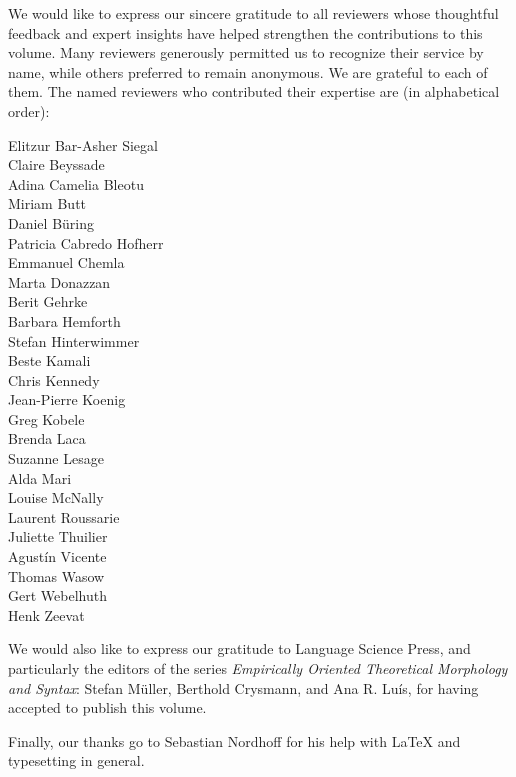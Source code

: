 \addchap{\lsAcknowledgementTitle} 

We would like to express our sincere gratitude to all reviewers whose thoughtful feedback and expert insights have helped strengthen the contributions to this volume. Many reviewers generously permitted us to recognize their service by name, while others preferred to remain anonymous. We are grateful to each of them. The named reviewers who contributed their expertise are (in alphabetical order):
\begin{center}
    
\begin{multicols}{2}
\noindent{}Elitzur Bar-Asher Siegal\\
Claire Beyssade\\
Adina Camelia Bleotu\\
Miriam Butt\\
Daniel Büring\\
Patricia Cabredo Hofherr\\
Emmanuel Chemla\\
Marta Donazzan\\
Berit Gehrke\\
Barbara Hemforth\\
Stefan Hinterwimmer\\
Beste Kamali\\
Chris Kennedy\\
Jean-Pierre Koenig\\
Greg Kobele\\
Brenda Laca\\
Suzanne Lesage\\
Alda Mari\\
Louise McNally\\
Laurent Roussarie\\
Juliette Thuilier\\
Agustín Vicente\\
Thomas Wasow\\
Gert Webelhuth\\
Henk Zeevat\\
\end{multicols}
\end{center}

We would also like to express our gratitude to Language Science Press, and particularly the editors of the series \emph{Empirically Oriented Theoretical Morphology and Syntax}: Stefan Müller, Berthold Crysmann, and Ana R. Luís, for having accepted to publish this volume. 

Finally, our thanks go to Sebastian Nordhoff for his help with \LaTeX{} and typesetting in general. 

